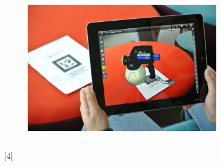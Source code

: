 \begin{figure}[htbp]
\centering
\includegraphics[width=240pt,height=180pt,keepaspectratio]{graphics/ARpad.png}
\caption{\cite{javaObjectClass}}
\end{figure}
[4]\\
\\

